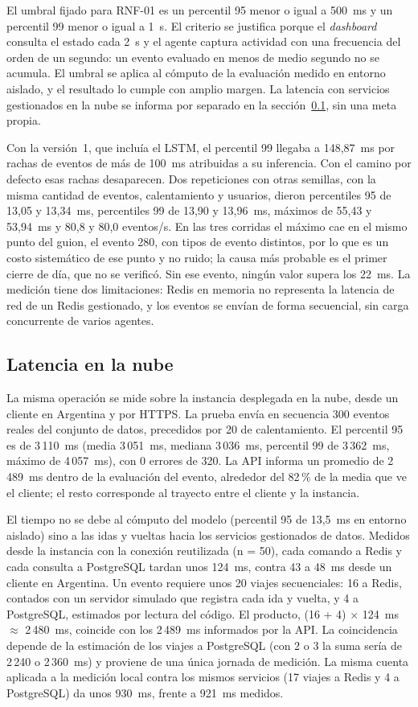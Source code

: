 El umbral fijado para RNF-01 es un percentil 95 menor o igual a 500~ms y un percentil 99 menor o igual a 1~s. El criterio se justifica porque el \emph{dashboard} consulta el estado cada 2~s y el agente captura actividad con una frecuencia del orden de un segundo: un evento evaluado en menos de medio segundo no se acumula. El umbral se aplica al cómputo de la evaluación medido en entorno aislado, y el resultado lo cumple con amplio margen. La latencia con servicios gestionados en la nube se informa por separado en la sección~\ref{sec:latencia-aws}, sin una meta propia.

Con la versión~1, que incluía el LSTM, el percentil 99 llegaba a 148,87~ms por rachas de eventos de más de 100~ms atribuidas a su inferencia. Con el camino por defecto esas rachas desaparecen. Dos repeticiones con otras semillas, con la misma cantidad de eventos, calentamiento y usuarios, dieron percentiles 95 de 13,05 y 13,34~ms, percentiles 99 de 13,90 y 13,96~ms, máximos de 55,43 y 53,94~ms y 80,8 y 80,0 eventos/s. En las tres corridas el máximo cae en el mismo punto del guion, el evento 280, con tipos de evento distintos, por lo que es un costo sistemático de ese punto y no ruido; la causa más probable es el primer cierre de día, que no se verificó. Sin ese evento, ningún valor supera los 22~ms. La medición tiene dos limitaciones: Redis en memoria no representa la latencia de red de un Redis gestionado, y los eventos se envían de forma secuencial, sin carga concurrente de varios agentes.

\subsection{Latencia en la nube}\label{sec:latencia-aws}
La misma operación se mide sobre la instancia desplegada en la nube, desde un cliente en Argentina y por HTTPS. La prueba envía en secuencia 300 eventos reales del conjunto de datos, precedidos por 20 de calentamiento. El percentil 95 es de 3\,110~ms (media 3\,051~ms, mediana 3\,036~ms, percentil 99 de 3\,362~ms, máximo de 4\,057~ms), con 0 errores de 320. La API informa un promedio de 2\,489~ms dentro de la evaluación del evento, alrededor del 82\,\% de la media que ve el cliente; el resto corresponde al trayecto entre el cliente y la instancia.

El tiempo no se debe al cómputo del modelo (percentil 95 de 13,5~ms en entorno aislado) sino a las idas y vueltas hacia los servicios gestionados de datos. Medidos desde la instancia con la conexión reutilizada (n = 50), cada comando a Redis y cada consulta a PostgreSQL tardan unos 124~ms, contra 43 a 48~ms desde un cliente en Argentina. Un evento requiere unos 20 viajes secuenciales: 16 a Redis, contados con un servidor simulado que registra cada ida y vuelta, y 4 a PostgreSQL, estimados por lectura del código. El producto, (16 + 4) $\times$ 124~ms $\approx$ 2\,480~ms, coincide con los 2\,489~ms informados por la API. La coincidencia depende de la estimación de los viajes a PostgreSQL (con 2 o 3 la suma sería de 2\,240 o 2\,360~ms) y proviene de una única jornada de medición. La misma cuenta aplicada a la medición local contra los mismos servicios (17 viajes a Redis y 4 a PostgreSQL) da unos 930~ms, frente a 921~ms medidos.

